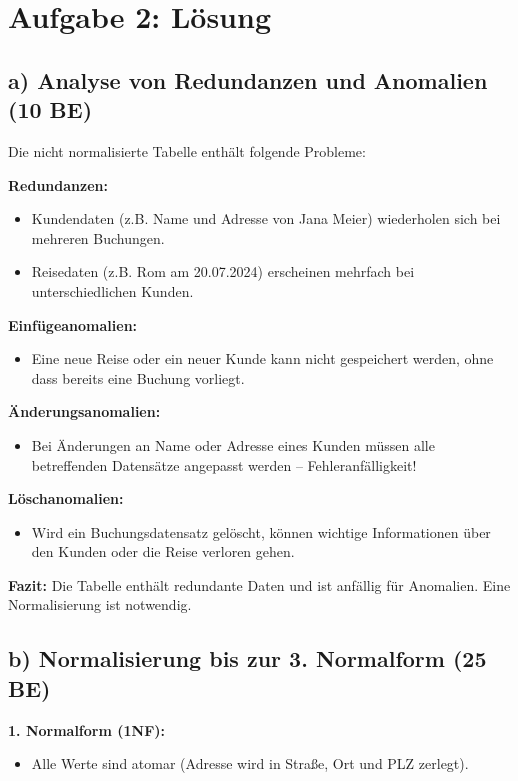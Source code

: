 \documentclass{article}
\begin{document}
	\section*{Aufgabe 2: Lösung}
	
	\subsection*{a) Analyse von Redundanzen und Anomalien (10 BE)}
	
	Die nicht normalisierte Tabelle enthält folgende Probleme:
	
	\textbf{Redundanzen:}
	\begin{itemize}
		\item Kundendaten (z.B. Name und Adresse von Jana Meier) wiederholen sich bei mehreren Buchungen.
		\item Reisedaten (z.B. Rom am 20.07.2024) erscheinen mehrfach bei unterschiedlichen Kunden.
	\end{itemize}
	
	\textbf{Einfügeanomalien:}
	\begin{itemize}
		\item Eine neue Reise oder ein neuer Kunde kann nicht gespeichert werden, ohne dass bereits eine Buchung vorliegt.
	\end{itemize}
	
	\textbf{Änderungsanomalien:}
	\begin{itemize}
		\item Bei Änderungen an Name oder Adresse eines Kunden müssen alle betreffenden Datensätze angepasst werden – Fehleranfälligkeit!
	\end{itemize}
	
	\textbf{Löschanomalien:}
	\begin{itemize}
		\item Wird ein Buchungsdatensatz gelöscht, können wichtige Informationen über den Kunden oder die Reise verloren gehen.
	\end{itemize}
	
	\textbf{Fazit:} Die Tabelle enthält redundante Daten und ist anfällig für Anomalien. Eine Normalisierung ist notwendig.
	
	\subsection*{b) Normalisierung bis zur 3. Normalform (25 BE)}
	
	\textbf{1. Normalform (1NF):}
	\begin{itemize}
		\item Alle Werte sind atomar (Adresse wird in Straße, Ort und PLZ zerlegt).
	\end{itemize}
	
\end{document}
